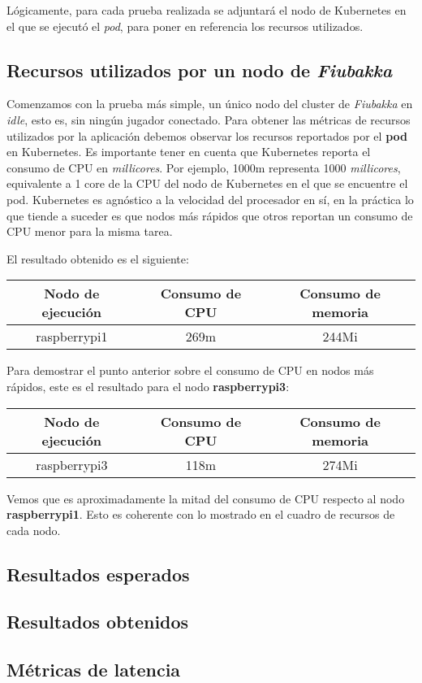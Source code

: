 Lógicamente, para cada prueba realizada se adjuntará el nodo de Kubernetes en el que se ejecutó el \textit{pod}, para poner en referencia los recursos utilizados.

\subsection{Recursos utilizados por un nodo de \textit{Fiubakka}}

\noindent Comenzamos con la prueba más simple, un único nodo del cluster de \textit{Fiubakka} en \textit{idle}, esto es, sin ningún jugador conectado.
Para obtener las métricas de recursos utilizados por la aplicación debemos observar los recursos reportados por el \textbf{pod} en Kubernetes.
Es importante tener en cuenta que Kubernetes reporta el consumo de CPU en \textit{millicores}. Por ejemplo, 1000m representa 1000 \textit{millicores}, equivalente
a 1 core de la CPU del nodo de Kubernetes en el que se encuentre el pod. Kubernetes es agnóstico a la velocidad del procesador en sí, en la práctica lo que tiende a suceder
es que nodos más rápidos que otros reportan un consumo de CPU menor para la misma tarea.

\noindent El resultado obtenido es el siguiente:

\begin{center}
\begin{tabular}{|c|c|c|}
    \hline
    \textbf{Nodo de ejecución} & \textbf{Consumo de CPU} & \textbf{Consumo de memoria} \\
    \hline
    raspberrypi1 & 269m & 244Mi \\
    \hline
\end{tabular}
\end{center}

\noindent Para demostrar el punto anterior sobre el consumo de CPU en nodos más rápidos, este es el resultado para el nodo \textbf{raspberrypi3}:

\begin{center}
    \begin{tabular}{|c|c|c|}
    \hline
    \textbf{Nodo de ejecución} & \textbf{Consumo de CPU} & \textbf{Consumo de memoria} \\
    \hline
    raspberrypi3 & 118m & 274Mi \\
    \hline
\end{tabular}
\end{center}

\noindent Vemos que es aproximadamente la mitad del consumo de CPU respecto al nodo \textbf{raspberrypi1}. Esto es coherente con lo mostrado en el cuadro de recursos de cada
nodo.


\subsection{Resultados esperados}

\subsection{Resultados obtenidos}

\subsection{Métricas de latencia}
